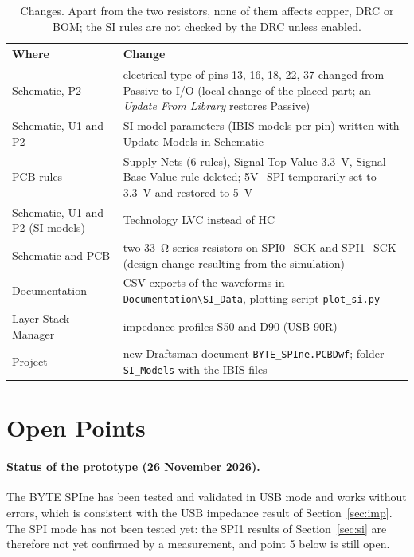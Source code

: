 \documentclass[11pt,a4paper]{article}
\newcommand{\gui}[1]{\textsf{#1}}
\begin{document}
\begin{table}[H]
\centering
\begin{tabular}{>{\raggedright\arraybackslash}p{}>{\raggedright\arraybackslash}p{}}
\toprule
Where & Change \\
\midrule
Schematic, P2 & electrical type of pins 13, 16, 18, 22, 37 changed from Passive to I/O (local change of the placed part; an
\textit{Update From Library} restores Passive) \\
Schematic, U1 and P2 & SI model parameters (IBIS models per pin) written with \gui{Update Models in Schematic} \\
PCB rules & Supply Nets (6 rules), Signal Top Value \qty{3.3}{V}, Signal Base Value rule deleted; 5V\_SPI temporarily set to \qty{3.3}{V}
and restored to \qty{5}{V} \\
Schematic, U1 and P2 (SI models) & Technology LVC instead of HC \\
Schematic and PCB & two \qty{33}{\ohm} series resistors on SPI0\_SCK and SPI1\_SCK (design change resulting from the simulation) \\
Documentation & CSV exports of the waveforms in \texttt{Documentation\textbackslash SI\_Data}, plotting script \texttt{plot\_si.py} \\
Layer Stack Manager & impedance profiles S50 and D90 (USB 90R) \\
Project & new Draftsman document \texttt{BYTE\_SPIne.PCBDwf}; folder \texttt{SI\_Models} with the IBIS files \\
\bottomrule
\end{tabular}
\caption{Changes. Apart from the two resistors, none of them affects copper, DRC or BOM;
the SI rules are not checked by the DRC unless enabled.}
\label{tab:changes}
\end{table}

\section{Open Points}\label{sec:open}

\paragraph{Status of the prototype (26 November 2026).} The BYTE SPIne has been tested and validated
in USB mode and works without errors, which is consistent with the USB impedance result of
Section~\ref{sec:imp}. The SPI mode has not been tested yet: the SPI1 results of Section~\ref{sec:si} are
therefore not yet confirmed by a measurement, and point 5 below is still open.
\end{document}
